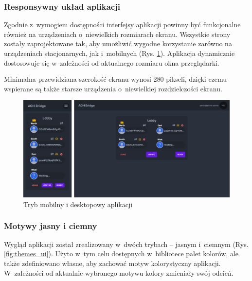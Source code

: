 \subsubsection{Responsywny układ aplikacji}

Zgodnie z~wymogiem dostępności interfejsy aplikacji powinny
być funkcjonalne również na urządzeniach o~niewielkich
rozmiarach ekranu. Wszystkie strony zostały zaprojektowane
tak, aby umożliwić wygodne korzystanie zarówno na urządzeniach
stacjonarnych, jak i~mobilnych (Rys. \ref{fig:responsive_ui}). Aplikacja dynamicznie
dostosowuje się w~zależności od aktualnego rozmiaru okna
przeglądarki.

Minimalna przewidziana
szerokość ekranu wynosi 280 pikseli, dzięki czemu wspierane
są także starsze urządzenia o~niewielkiej rozdzielczości
ekranu.

\begin{figure}[h!]
  \centering
  \includegraphics[width=\textwidth]{img/widoki/desktop_mobile.png}
  \caption{Tryb mobilny i desktopowy aplikacji}
  \label{fig:responsive_ui}
\end{figure}

\FloatBarrier

\subsubsection{Motywy jasny i ciemny}

Wygląd aplikacji został zrealizowany w~dwóch trybach --
jasnym i~ciemnym (Rys. \ref{fig:themes_ui}). Użyto w~tym celu dostępnych w~bibliotece
palet kolorów, ale także zdefiniowano własne, aby zachować
motyw kolorystyczny aplikacji. W~zależności od aktualnie
wybranego motywu kolory zmieniały swój odcień.


